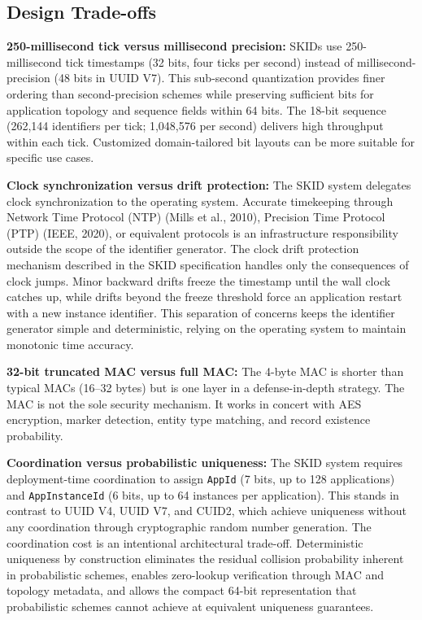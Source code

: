 \documentclass[fleqn,10pt]{wlpeerj}
\begin{document}
\subsection{Design Trade-offs}\label{design-trade-offs}

\textbf{250-millisecond tick versus millisecond precision:} SKIDs use
250-millisecond tick timestamps (32 bits, four ticks per second) instead
of millisecond-precision (48 bits in UUID V7). This sub-second
quantization provides finer ordering than second-precision schemes while
preserving sufficient bits for application topology and sequence fields
within 64 bits. The 18-bit sequence (262,144 identifiers per tick;
1,048,576 per second) delivers high throughput within each tick.
Customized domain-tailored bit layouts can be more suitable for specific
use cases.

\textbf{Clock synchronization versus drift protection:} The SKID system
delegates clock synchronization to the operating system. Accurate
timekeeping through Network Time Protocol (NTP) (Mills et al., 2010),
Precision Time Protocol (PTP) (IEEE, 2020), or equivalent protocols is
an infrastructure responsibility outside the scope of the identifier
generator. The clock drift protection mechanism described in the SKID
specification handles only the consequences of clock jumps. Minor
backward drifts freeze the timestamp until the wall clock catches up,
while drifts beyond the freeze threshold force an application restart
with a new instance identifier. This separation of concerns keeps the
identifier generator simple and deterministic, relying on the operating
system to maintain monotonic time accuracy.

\textbf{32-bit truncated MAC versus full MAC:} The 4-byte MAC is shorter
than typical MACs (16--32 bytes) but is one layer in a defense-in-depth
strategy. The MAC is not the sole security mechanism. It works in
concert with AES encryption, marker detection, entity type matching, and
record existence probability.

\textbf{Coordination versus probabilistic uniqueness:} The SKID system
requires deployment-time coordination to assign \texttt{AppId} (7 bits,
up to 128 applications) and \texttt{AppInstanceId} (6 bits, up to 64
instances per application). This stands in contrast to UUID V4, UUID V7,
and CUID2, which achieve uniqueness without any coordination through
cryptographic random number generation. The coordination cost is an
intentional architectural trade-off. Deterministic uniqueness by
construction eliminates the residual collision probability inherent in
probabilistic schemes, enables zero-lookup verification through MAC and
topology metadata, and allows the compact 64-bit representation that
probabilistic schemes cannot achieve at equivalent uniqueness
guarantees.
\end{document}
